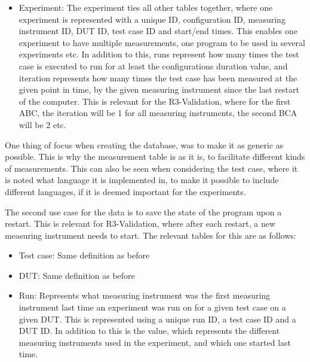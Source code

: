 \begin{itemize}
    \item Experiment: The experiment ties all other tables together, where one experiment is represented with a unique ID, configuration ID, measuring instrument ID, DUT ID, test case ID and start/end times. This enables one experiment to have multiple measurements, one program to be used in several experiments etc. In addition to this, runs represent how many times the test case is executed to run for at least the configurations duration value, and iteration represents how many times the test case has been measured at the given point in time, by the given measuring instrument since the last restart of the computer. This is relevant for the R3-Validation, where for the first ABC, the iteration will be 1 for all measuring instruments, the second BCA will be 2 etc.
\end{itemize}

One thing of focus when creating the database, was to make it as generic as possible. This is why the measurement table is as it is, to facilitate different kinds of measurements. This can also be seen when considering the test case, where it is noted what language it is implemented in, to make it possible to include different languages, if it is deemed important for the experiments.


The second use case for the data is to save the state of the program upon a restart. This is relevant for R3-Validation, where after each restart, a new measuring instrument needs to start. The relevant tables for this are as follows:

\begin{itemize}
    \item Test case: Same definition as before
    \item DUT: Same definition as before
    \item Run: Represents what measuring instrument was the first measuring instrument last time an experiment was run on for a given test case on a given DUT. This is represented using a unique run ID, a test case ID and a DUT ID. In addition to this is the value, which represents the different measuring instruments used in the experiment, and which one started last time.
\end{itemize}


